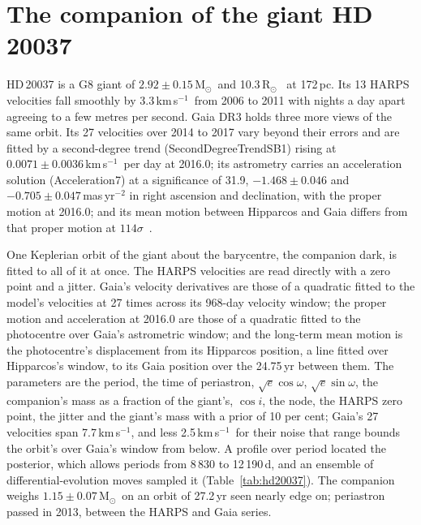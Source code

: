 \documentclass[3p,11pt]{elsarticle}
\newcommand{\kms}{km\,s$^{-1}$}
\newcommand{\Msun}{M$_\odot$}
\begin{document}
\section{The companion of the giant HD\,20037}\label{sec:hd20037}

HD\,20037 is a G8 giant of $2.92 \pm 0.15$\,\Msun\ and 10.3\,R$_\odot$~\cite{Kervella2022} at
172\,pc. Its 13 HARPS velocities fall smoothly by 3.3\,\kms\ from 2006 to 2011 with nights a day
apart agreeing to a few metres per second. Gaia DR3 holds three more views of the same orbit. Its
27 velocities over 2014 to 2017 vary beyond their errors and are fitted by a second-degree trend
(SecondDegreeTrendSB1) rising at $0.0071 \pm 0.0036$\,\kms\ per day at 2016.0; its astrometry
carries an acceleration solution (Acceleration7) at a significance of 31.9, $-1.468 \pm 0.046$
and $-0.705 \pm 0.047$\,mas\,yr$^{-2}$ in right ascension and declination, with the proper
motion at 2016.0; and its mean motion between Hipparcos and Gaia differs from that proper motion
at $114\sigma$~\cite{Kervella2022}.

One Keplerian orbit of the giant about the barycentre, the companion dark, is fitted to all of it
at once. The HARPS velocities are read directly with a zero point and a jitter. Gaia's velocity
derivatives are those of a quadratic fitted to the model's velocities at 27 times across its
968-day velocity window; the proper motion and acceleration at 2016.0 are those of a quadratic
fitted to the photocentre over Gaia's astrometric window; and the long-term mean motion is the
photocentre's displacement from its Hipparcos position, a line fitted over Hipparcos's window,
to its Gaia position over the 24.75\,yr between them. The parameters are the period, the time of
periastron, $\sqrt{e}\cos\omega$, $\sqrt{e}\sin\omega$, the companion's mass as a fraction of the
giant's, $\cos i$, the node, the HARPS zero point, the jitter and the giant's mass with a prior of
10 per cent; Gaia's 27 velocities span 7.7\,\kms, and less 2.5\,\kms\ for their noise that range
bounds the orbit's over Gaia's window from below. A profile over period located the posterior,
which allows periods from 8\,830 to 12\,190\,d, and an ensemble of differential-evolution moves
sampled it (Table~\ref{tab:hd20037}). The companion weighs $1.15 \pm 0.07$\,\Msun\ on an orbit of
27.2\,yr seen nearly edge on; periastron passed in 2013, between the HARPS and Gaia series.
\end{document}
